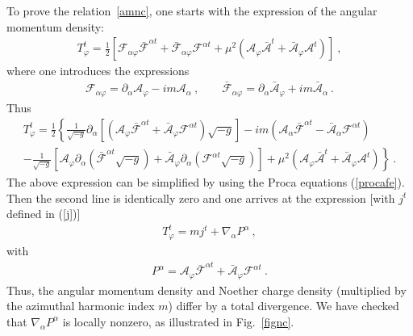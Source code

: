 To prove the relation~\eqref{amnc}, one starts with the  expression of the angular momentum density:
\begin{eqnarray}
\label{s1}
T_\varphi^t=\frac{1}{2}
\left [
 {\mathcal{F}}_{\alpha \varphi} \bar{\mathcal{F}}^{\alpha t}+\bar{\mathcal{F}}_{\alpha \varphi}  {\mathcal{F}}^{\alpha t}
 +\mu^2 (
\mathcal{A}_{\varphi} \bar{\mathcal{A}}^{t}
 +\bar{\mathcal{A}}_{\varphi}\mathcal{A}^{t}
)
\right ]  \ ,
\end{eqnarray}
where one introduces the expressions  
\begin{eqnarray}
\label{s2}
 {\mathcal{F}}_{\alpha \varphi} =\partial_\alpha {\mathcal{A}}_{\varphi}-i m {\mathcal{A}}_{\alpha}\ , \qquad 
\bar{ {\mathcal{F}}}_{\alpha \varphi} =\partial_\alpha \bar{{\mathcal{A}}}_{\varphi}+i m \bar{{\mathcal{A}}}_{\alpha} \ .
\end{eqnarray}
Thus
\begin{eqnarray}
\label{s3}
T_\varphi^t  
=\frac{1}{2}
\left\{
\frac{1}{\sqrt{-g}}\partial_\alpha \left[ ({\mathcal{A}}_\varphi \bar{ {\mathcal{F}}}^{\alpha t}+\bar{\mathcal{A}}_\varphi { {\mathcal{F}}}^{\alpha t}  )\sqrt{-g} \right]
-i m 
(
\mathcal{A}_{\alpha} \bar{ {\mathcal{F}}}^{\alpha t}
- 
 \bar{\mathcal{A}}_{\alpha}{ {\mathcal{F}}}^{\alpha t}
)
\right.
\nonumber 
\\
\left. - \frac{1}{\sqrt{-g}}\left[{\mathcal{A}}_\varphi\partial_\alpha( \bar{ {\mathcal{F}}}^{\alpha t}\sqrt{-g})
+\bar{\mathcal{A}}_\varphi \partial_\alpha({ {\mathcal{F}}}^{\alpha t} \sqrt{-g}) \right] 
+\mu^2 (
\mathcal{A}_{\varphi} \bar{\mathcal{A}}^{t}
 +\bar{\mathcal{A}}_{\varphi}\mathcal{A}^{t}
)
\right\} \ .
\end{eqnarray}
The above expression can be simplified by using the Proca equations (\ref{procafe}).
Then the second line is identically zero and one arrives at the expression
[with $j^t$ defined  in (\ref{j})]
\begin{eqnarray}
\label{s4}
T_\varphi^t  =m j^t 
+ \nabla_\alpha P^\alpha \ ,
\end{eqnarray}
with
\begin{eqnarray}
\label{s5}
  P^\alpha= {\mathcal{A}}_\varphi \bar{ {\mathcal{F}}}^{\alpha t}+\bar{\mathcal{A}}_\varphi { {\mathcal{F}}}^{\alpha t}   \ .
\end{eqnarray}
Thus, the angular momentum density and Noether charge density (multiplied by the azimuthal harmonic index $m$) differ by a total divergence. We have checked that $\nabla_\alpha P^\alpha$ is locally nonzero, as illustrated in Fig.~\ref{fignc}. 

